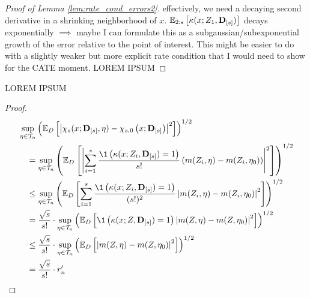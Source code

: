 \begin{proof}[Proof of Lemma \ref{lem:rate_cond_errors2}]
    {\color{blue} effectively, we need a decaying second derivative in a shrinking neighborhood of $x$.
    $\mathbb{E}_{2:s}\left[\kappa(x; Z_{1}, \mathbf{D}_{[s]})\right]$ decays exponentially $\implies$ maybe I can formulate this as a subgaussian/subexponential growth of the error relative to the point of interest.
    This might be easier to do with a slightly weaker but more explicit rate condition that I would need to show for the CATE moment.}
    {\color{red} LOREM IPSUM}
\end{proof}

\begin{boxD}
    \begin{lem}
        {\color{red} LOREM IPSUM}
    \end{lem}    
\end{boxD}

\begin{proof}
    \begin{equation}
        \begin{aligned}
            & \sup_{\eta \in \mathcal{T}_{n}}\left(
                \E_{D}\left[
                    \left|\chi_{s}(x; \mathbf{D}_{[s]}, \eta) - \chi_{s,0}\left(x; \mathbf{D}_{[s]}\right)
                    \right|^2
                \right]
            \right)^{1 / 2} \\
            & \quad = \sup_{\eta \in \mathcal{T}_{n}}\left(
                \E_{D}\left[
                    \left|\sum_{i = 1}^{s}\frac{\1\left(\kappa(x; Z_{i}, \mathbf{D}_{[s]}) = 1\right)}{s!} 
                    \left(m(Z_{i}, \eta) - m(Z_{i}, \eta_{0})\right)
                    \right|^2
                \right]
            \right)^{1 / 2} \\
            & \quad \leq \sup_{\eta \in \mathcal{T}_{n}}\left(
                \E_{D}\left[\sum_{i = 1}^{s}\frac{\1\left(\kappa(x; Z_{i}, \mathbf{D}_{[s]}) = 1\right)}{(s!)^{2}}
                    \left| m(Z_{i}, \eta) - m(Z_{i}, \eta_{0})\right|^2
                \right]
            \right)^{1 / 2} \\
            & \quad = \frac{\sqrt{s}}{s!} \cdot \sup_{\eta \in \mathcal{T}_{n}}\left(
                 \E_{D}\left[\1\left(\kappa(x; Z, \mathbf{D}_{[s]}) = 1\right)
                    \left| m(Z, \eta) - m(Z, \eta_{0})\right|^2
                \right]
            \right)^{1 / 2} \\
            & \quad \leq \frac{\sqrt{s}}{s!} \cdot \sup_{\eta \in \mathcal{T}_{n}}\left(
                \E_{D}\left[\left| m(Z, \eta) - m(Z, \eta_{0})\right|^2\right]
            \right)^{1 / 2} \\
            & \quad = \frac{\sqrt{s}}{s!} \cdot r_{n}^{\prime}
        \end{aligned}
    \end{equation}
\end{proof}

